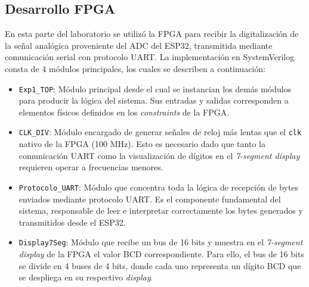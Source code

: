 \documentclass[letterpaper, 12pt]{article}
\begin{document}
\subsection{Desarrollo FPGA}
En esta parte del laboratorio se utilizó la FPGA para recibir la digitalización de la señal analógica proveniente del ADC del ESP32, transmitida mediante comunicación serial con protocolo UART. La implementación en SystemVerilog consta de 4 módulos principales, los cuales se describen a continuación:
\begin{itemize}
\item \texttt{Exp1\_TOP}: Módulo principal desde el cual se instancian los demás módulos para producir la lógica del sistema. Sus entradas y salidas corresponden a elementos físicos definidos en los \textit{constraints} de la FPGA.
\item \texttt{CLK\_DIV}: Módulo encargado de generar señales de reloj más lentas que el \texttt{clk} nativo de la FPGA (100 MHz). Esto es necesario dado que tanto la comunicación UART como la visualización de dígitos en el \textit{7-segment display} requieren operar a frecuencias menores.
\item \texttt{Protocolo\_UART}: Módulo que concentra toda la lógica de recepción de bytes enviados mediante protocolo UART. Es el componente fundamental del sistema, responsable de leer e interpretar correctamente los bytes generados y transmitidos desde el ESP32.
\item \texttt{Display7Seg}: Módulo que recibe un bus de 16 bits y muestra en el \textit{7-segment display} de la FPGA el valor BCD correspondiente. Para ello, el bus de 16 bits se divide en 4 buses de 4 bits, donde cada uno representa un dígito BCD que se despliega en su respectivo \textit{display}.
\end{itemize}
\end{document}
